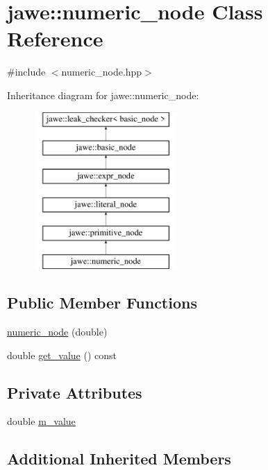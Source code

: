 \hypertarget{classjawe_1_1numeric__node}{}\section{jawe\+:\+:numeric\+\_\+node Class Reference}
\label{classjawe_1_1numeric__node}


{\ttfamily \#include $<$numeric\+\_\+node.\+hpp$>$}

Inheritance diagram for jawe\+:\+:numeric\+\_\+node\+:\begin{figure}[H]
\begin{center}
\leavevmode
\includegraphics[height=6.000000cm]{classjawe_1_1numeric__node}
\end{center}
\end{figure}
\subsection*{Public Member Functions}
\begin{DoxyCompactItemize}
\item 
\hyperlink{classjawe_1_1numeric__node_aed918eb5e1aafb9dedbd6d3c166ef50a}{numeric\+\_\+node} (double)
\item 
double \hyperlink{classjawe_1_1numeric__node_a31704e41d7bf65d3adc772942e40eb58}{get\+\_\+value} () const
\end{DoxyCompactItemize}
\subsection*{Private Attributes}
\begin{DoxyCompactItemize}
\item 
double \hyperlink{classjawe_1_1numeric__node_a1c74e7143ecc43b45cb39c3adb962828}{m\+\_\+value}
\end{DoxyCompactItemize}
\subsection*{Additional Inherited Members}


